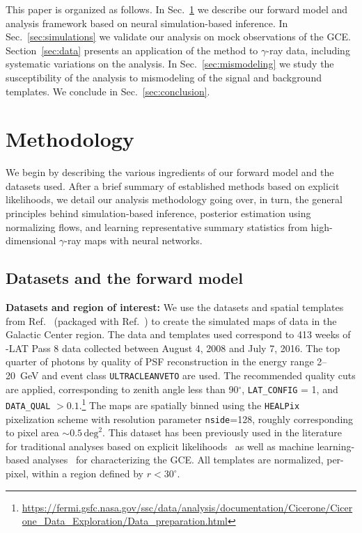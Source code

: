 \documentclass[prd,aps,10pt,nofootinbib,twocolumn,superscriptaddress,preprintnumbers,balancelastpage,longbibliography]{revtex4-1}
\begin{document}
This paper is organized as follows. In Sec.~\ref{sec:analysis} we describe our forward model and analysis framework based on neural simulation-based inference. In Sec.~\ref{sec:simulations} we validate our analysis on mock observations of the \Fermi GCE. Section~\ref{sec:data} presents an application of the method to \Fermi $\gamma$-ray data, including systematic variations on the analysis. In Sec.~\ref{sec:mismodeling} we study the susceptibility of the analysis to mismodeling of the signal and background templates. We conclude in Sec.~\ref{sec:conclusion}.

\section{Methodology}
\label{sec:analysis}

We begin by describing the various ingredients of our forward model and the datasets used. After a brief summary of established methods based on explicit likelihoods, we detail our analysis methodology going over, in turn, the general principles behind simulation-based inference, posterior estimation using normalizing flows, and learning representative summary statistics from high-dimensional $\gamma$-ray maps with neural networks.

\subsection{Datasets and the forward model}
\label{sec:datasets}

\noindent
\textbf{Datasets and region of interest:} We use the datasets and spatial templates from Ref.~\cite{rodd_nicholas_safdi_siddharth_2016} (packaged with Ref.~\cite{Mishra-Sharma:2016gis}) to create the simulated maps of \Fermi data in the Galactic Center region. The data and templates used correspond to 413 weeks of \Fermi-LAT Pass 8 data collected between August 4, 2008 and July 7, 2016. The top quarter of photons by quality of PSF reconstruction in the energy range 2--20~GeV and event class \texttt{ULTRACLEANVETO} are used. The recommended quality cuts are applied, corresponding to zenith angle less than 90$^\circ$, \texttt{LAT\_CONFIG} = 1, and \texttt{DATA\_QUAL} $> 0.1$.\footnote{\url{https://fermi.gsfc.nasa.gov/ssc/data/analysis/documentation/Cicerone/Cicerone_Data_Exploration/Data_preparation.html}} The maps are spatially binned using the \texttt{HEALPix}~\cite{Gorski:2004by} pixelization scheme with resolution parameter \texttt{nside}=128, roughly corresponding to pixel area $\sim 0.5\,\mathrm{deg}^2$. This dataset has been previously used in the literature for traditional analyses based on explicit likelihoods~\cite{Buschmann:2020adf,Chang:2019ars,Leane:2019xiy} as well as machine learning-based analyses~\cite{List:2020mzd} for characterizing the GCE. All templates are normalized, per-pixel, within a region defined by $r < 30^\circ$.
\end{document}
